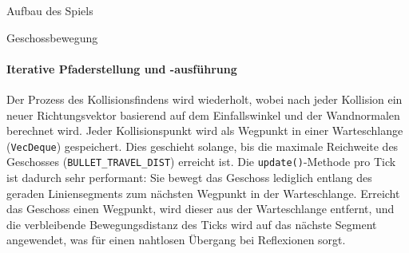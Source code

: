 \begin{section}{Aufbau des Spiels}
\begin{subsection}{Geschossbewegung}
\paragraph{Iterative Pfaderstellung und -ausführung}
Der Prozess des Kollisionsfindens wird wiederholt, wobei nach jeder Kollision ein neuer Richtungsvektor basierend auf dem Einfallswinkel und der Wandnormalen berechnet wird.
Jeder Kollisionspunkt wird als Wegpunkt in einer Warteschlange (\texttt{VecDeque}) gespeichert.
Dies geschieht solange, bis die maximale Reichweite des Geschosses (\texttt{BULLET\_TRAVEL\_DIST}) erreicht ist.
Die \texttt{update()}-Methode pro Tick ist dadurch sehr performant: Sie bewegt das Geschoss lediglich entlang des geraden Liniensegments zum nächsten Wegpunkt in der Warteschlange.
Erreicht das Geschoss einen Wegpunkt, wird dieser aus der Warteschlange entfernt, und die verbleibende Bewegungsdistanz des Ticks wird auf das nächste Segment angewendet, was für einen nahtlosen Übergang bei Reflexionen sorgt.
\end{subsection}

\end{section}